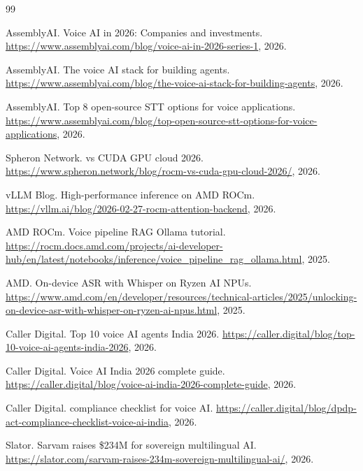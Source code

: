 \documentclass[12pt,a4paper]{article}
\begin{document}
\begin{thebibliography}{99}

AssemblyAI.
\newblock Voice {AI} in 2026: Companies and investments.
\newblock \url{https://www.assemblyai.com/blog/voice-ai-in-2026-series-1}, 2026.

AssemblyAI.
\newblock The voice {AI} stack for building agents.
\newblock \url{https://www.assemblyai.com/blog/the-voice-ai-stack-for-building-agents}, 2026.

AssemblyAI.
\newblock Top 8 open-source {STT} options for voice applications.
\newblock \url{https://www.assemblyai.com/blog/top-open-source-stt-options-for-voice-applications}, 2026.

Spheron Network.
 vs {CUDA} {GPU} cloud 2026.
\newblock \url{https://www.spheron.network/blog/rocm-vs-cuda-gpu-cloud-2026/}, 2026.

vLLM Blog.
\newblock High-performance inference on {AMD} {ROCm}.
\newblock \url{https://vllm.ai/blog/2026-02-27-rocm-attention-backend}, 2026.

{AMD ROCm}.
\newblock Voice pipeline {RAG} {Ollama} tutorial.
\newblock \url{https://rocm.docs.amd.com/projects/ai-developer-hub/en/latest/notebooks/inference/voice_pipeline_rag_ollama.html}, 2025.

{AMD}.
\newblock On-device {ASR} with {Whisper} on {Ryzen AI NPUs}.
\newblock \url{https://www.amd.com/en/developer/resources/technical-articles/2025/unlocking-on-device-asr-with-whisper-on-ryzen-ai-npus.html}, 2025.

Caller Digital.
\newblock Top 10 voice {AI} agents {India} 2026.
\newblock \url{https://caller.digital/blog/top-10-voice-ai-agents-india-2026}, 2026.

Caller Digital.
\newblock Voice {AI} {India} 2026 complete guide.
\newblock \url{https://caller.digital/blog/voice-ai-india-2026-complete-guide}, 2026.

Caller Digital.
 compliance checklist for voice {AI}.
\newblock \url{https://caller.digital/blog/dpdp-act-compliance-checklist-voice-ai-india}, 2026.

Slator.
\newblock Sarvam raises \$234{M} for sovereign multilingual {AI}.
\newblock \url{https://slator.com/sarvam-raises-234m-sovereign-multilingual-ai/}, 2026.


\end{thebibliography}
\end{document}
